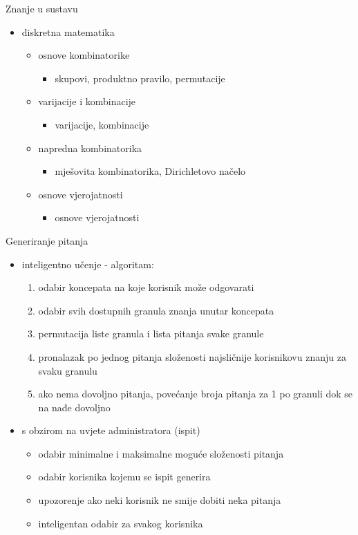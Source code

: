 \documentclass[times, utf8, numeric]{beamer}
\begin{document}
\begin{frame}{Znanje u sustavu}

\begin{itemize}
	\item diskretna matematika
	\begin{itemize}
		\item osnove kombinatorike
		\begin{itemize}
			\item skupovi, produktno pravilo, permutacije
		\end{itemize}
		\item varijacije i kombinacije
		\begin{itemize}
			\item varijacije, kombinacije
		\end{itemize}
	\item napredna kombinatorika
	\begin{itemize}
		\item mješovita kombinatorika, Dirichletovo načelo
	\end{itemize}
	\item osnove vjerojatnosti
	\begin{itemize}
		\item osnove vjerojatnosti
	\end{itemize}
\end{itemize}
	\end{itemize}
\end{frame}

\begin{frame}{Generiranje pitanja}
\begin{itemize}
	\item inteligentno učenje - algoritam:
	\begin{enumerate}
		\item odabir koncepata na koje korisnik može odgovarati
		\item odabir svih dostupnih granula znanja unutar koncepata
		\item permutacija liste granula i lista pitanja svake granule
		\item pronalazak po jednog pitanja složenosti najsličnije korisnikovu znanju za svaku granulu
		\item ako nema dovoljno pitanja, povećanje broja pitanja za 1 po granuli dok se na nađe dovoljno
	\end{enumerate}
	\item s obzirom na uvjete administratora (ispit)
	\begin{itemize}
		\item odabir minimalne i maksimalne moguće složenosti pitanja
		\item odabir korisnika kojemu se ispit generira
		\item upozorenje ako neki korisnik ne smije dobiti neka pitanja
		\item inteligentan odabir za svakog korisnika
	\end{itemize}
\end{itemize}
\end{frame}
\end{document}

